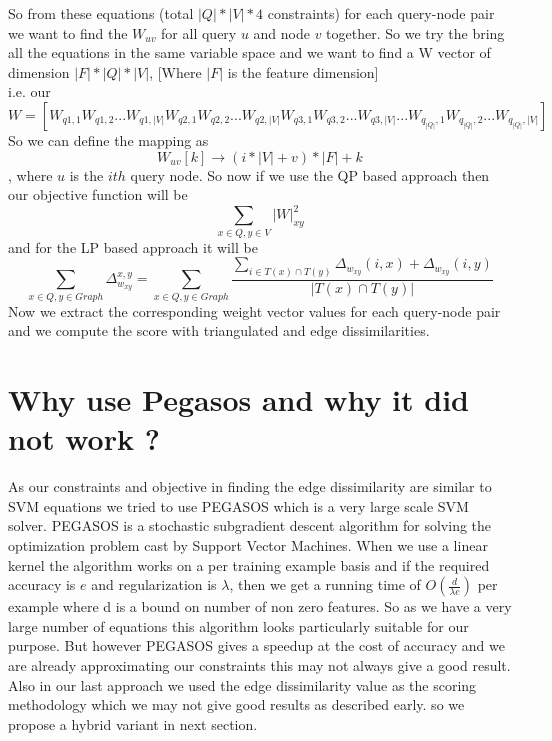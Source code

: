 \documentclass{article}
\begin{document}
So from these equations (total $|Q| * |V| * 4$ constraints) for each query-node pair  we want to find the $W_{uv}$ for all query $u$ and node $v$ together. So we try the bring all the equations in the same variable space and we want to find a W vector of dimension $|F|*|Q|*|V|$, [Where $|F|$ is the feature dimension]\\
i.e. our $$W = [W_{q1,1} W_{q1,2} ... W_{q1,|V|} W_{q2,1} W_{q2, 2} ... W_{q2,|V|} W_{q3,1} W_{q3,2} ... W_{q3,|V|}
... W_{q_{|Q|},1} W_{q_{|Q|}, 2} ... W_{q_{|Q|}, |V|}]$$
So we can define the mapping as
\begin{equation}
W_{uv} [k] \rightarrow (i*|V|+v)*|F| + k 
\end{equation}
, where $u$ is the $ith$ query node.
So now if we use the QP based approach then our objective function will be
\begin{equation}
\sum_{x \in Q, y \in V} |W|_{xy}^2
\end{equation}
and for the LP based approach it will be
\begin{equation}
\sum_{x \in Q,y \in Graph} \Delta_{w_{xy}}^{x,y} = \sum_{x \in Q,y \in Graph} \frac{\sum_{i \in T(x) \cap T(y)} \Delta_{w_{xy}}(i,x) + \Delta_{w_{xy}}(i,y)}{ |T(x) \cap T(y)|}
\end{equation}
Now we extract the corresponding weight vector values for each query-node pair and we compute the score with triangulated and edge dissimilarities.

\section*{Why use Pegasos and why it did not work ?}
As our constraints and objective in finding the edge dissimilarity are similar to SVM equations we tried to use PEGASOS which is a very large scale SVM solver. PEGASOS is a stochastic subgradient descent algorithm for solving the optimization problem cast by Support Vector Machines. When we use a linear kernel the algorithm works on a per training example basis and if the required accuracy is $e$ and regularization is $\lambda$, then we get a running time of $O(\frac {d}{\lambda e})$ per example where d is a bound on number of non zero features. So as we have a very large number of equations this algorithm looks particularly suitable for our purpose. But however PEGASOS gives a speedup at the cost of accuracy and we are already approximating our constraints this may not always give a good result. Also in our last approach we used the edge dissimilarity value as the scoring methodology which we may not give good results as described early. so we propose a hybrid variant in next section.
\end{document}
